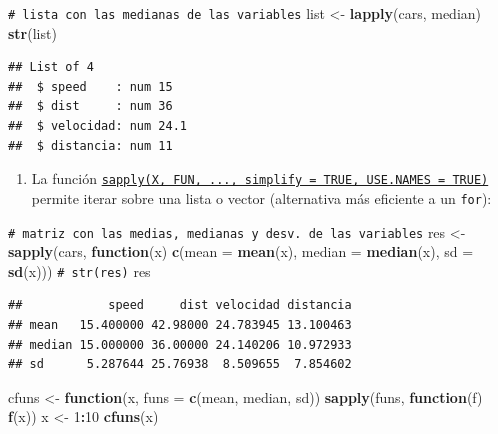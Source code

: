 \documentclass[
]{book}
\newenvironment{Shaded}{\begin{snugshade}}{\end{snugshade}}
\newcommand{\AttributeTok}[1]{\textcolor[rgb]{0.13,0.29,0.53}{#1}}
\newcommand{\CommentTok}[1]{\textcolor[rgb]{0.56,0.35,0.01}{\textit{#1}}}
\newcommand{\ControlFlowTok}[1]{\textcolor[rgb]{0.13,0.29,0.53}{\textbf{#1}}}
\newcommand{\DecValTok}[1]{\textcolor[rgb]{0.00,0.00,0.81}{#1}}
\newcommand{\FunctionTok}[1]{\textcolor[rgb]{0.13,0.29,0.53}{\textbf{#1}}}
\newcommand{\NormalTok}[1]{#1}
\newcommand{\OtherTok}[1]{\textcolor[rgb]{0.56,0.35,0.01}{#1}}
\newcommand{\SpecialCharTok}[1]{\textcolor[rgb]{0.81,0.36,0.00}{\textbf{#1}}}
\providecommand{\tightlist}{%
  \setlength{\itemsep}{0pt}\setlength{\parskip}{0pt}}
\theoremstyle{break}
\theoremstyle{nonumberplain}
\renewcommand{\CommentTok}[1]{\textcolor[rgb]{0.41,0.41,0.41}{\texttt{#1}}}
\begin{document}
\begin{Shaded}
\begin{Highlighting}[]
\CommentTok{\# lista con las medianas de las variables}
\NormalTok{list }\OtherTok{\textless{}{-}} \FunctionTok{lapply}\NormalTok{(cars, median)}
\FunctionTok{str}\NormalTok{(list)}
\end{Highlighting}
\end{Shaded}

\begin{verbatim}
## List of 4
##  $ speed    : num 15
##  $ dist     : num 36
##  $ velocidad: num 24.1
##  $ distancia: num 11
\end{verbatim}

\begin{enumerate}
\def\labelenumi{\alph{enumi}.}
\setcounter{enumi}{1}
\tightlist
\item
  La función
  \href{https://www.rdocumentation.org/packages/base/versions/3.6.1/topics/sapply}{\texttt{sapply(X,\ FUN,\ ...,\ simplify\ =\ TRUE,\ USE.NAMES\ =\ TRUE)}} permite iterar sobre una lista o vector (alternativa más eficiente a un \texttt{for}):
\end{enumerate}

\begin{Shaded}
\begin{Highlighting}[]
\CommentTok{\# matriz con las medias, medianas y desv. de las variables}
\NormalTok{res }\OtherTok{\textless{}{-}} \FunctionTok{sapply}\NormalTok{(cars, }
          \ControlFlowTok{function}\NormalTok{(x) }\FunctionTok{c}\NormalTok{(}\AttributeTok{mean =} \FunctionTok{mean}\NormalTok{(x), }
                        \AttributeTok{median =} \FunctionTok{median}\NormalTok{(x), }
                        \AttributeTok{sd =} \FunctionTok{sd}\NormalTok{(x)))}
\CommentTok{\# str(res)}
\NormalTok{res}
\end{Highlighting}
\end{Shaded}

\begin{verbatim}
##            speed     dist velocidad distancia
## mean   15.400000 42.98000 24.783945 13.100463
## median 15.000000 36.00000 24.140206 10.972933
## sd      5.287644 25.76938  8.509655  7.854602
\end{verbatim}

\begin{Shaded}
\begin{Highlighting}[]
\NormalTok{cfuns }\OtherTok{\textless{}{-}} \ControlFlowTok{function}\NormalTok{(x, }\AttributeTok{funs =} \FunctionTok{c}\NormalTok{(mean, median, sd))}
            \FunctionTok{sapply}\NormalTok{(funs, }\ControlFlowTok{function}\NormalTok{(f) }\FunctionTok{f}\NormalTok{(x))}
\NormalTok{x }\OtherTok{\textless{}{-}} \DecValTok{1}\SpecialCharTok{:}\DecValTok{10}
\FunctionTok{cfuns}\NormalTok{(x)}
\end{Highlighting}
\end{Shaded}
\end{document}
